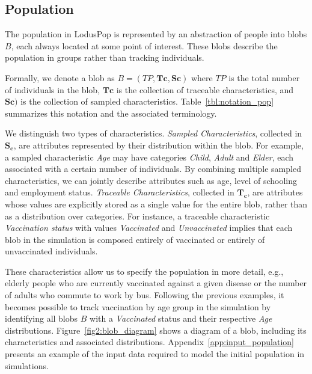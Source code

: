 \documentclass[pdflatex,sn-mathphys-num]{sn-jnl}%
\newcommand\redb[1]{#1}
\theoremstyle{thmstyleone}%
\theoremstyle{thmstyletwo}%
\theoremstyle{thmstylethree}%
\begin{document}
\subsection{Population}
\label{sec:population}
The population in LodusPop is represented by an abstraction of people into blobs $B$, each always located at some point of interest. These blobs describe the population in groups rather than tracking individuals.
\redb{
Formally, we denote a blob as $B = (TP, \bm{Tc}, \bm{Sc})$ where $TP$ is the total number of individuals in the blob, $\bm{Tc}$ is the collection of traceable characteristics, and $\bm{Sc})$ is the collection of sampled characteristics. Table~\ref{tbl:notation_pop} summarizes this notation and the associated terminology.

We distinguish two types of characteristics. \textit{Sampled Characteristics}, collected in $\bm{S_c}$, are attributes represented by their distribution within the blob. For example, a sampled characteristic \textit{Age} may have categories \textit{Child}, \textit{Adult} and \textit{Elder}, each associated with a certain number of individuals. By combining multiple sampled characteristics, we can jointly describe attributes such as age, level of schooling and employment status.
\textit{Traceable Characteristics}, collected in $\bm{T_c}$, are attributes whose values are explicitly stored as a single value for the entire blob, rather than as a distribution over categories. For instance, a traceable characteristic \textit{Vaccination status} with values \textit{Vaccinated} and \textit{Unvaccinated} implies that each blob in the simulation is composed entirely of vaccinated or entirely of unvaccinated individuals.
}

These characteristics allow us to specify the population in more detail, e.g., elderly people who are currently vaccinated against a given disease or the number of adults who commute to work by bus. Following the previous examples, it becomes possible to track vaccination by age group in the simulation by identifying all blobs $B$ with a \textit{Vaccinated} status and their respective \textit{Age} distributions. Figure~\ref{fig2:blob_diagram} shows a diagram of a blob, including its characteristics and associated distributions. Appendix~\ref{app:input_population} presents an example of the input data required to model the initial population in simulations.
\end{document}
